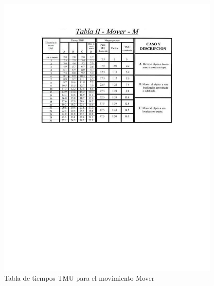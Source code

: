 \begin{figure}[H]
        \centering
        \includegraphics[trim = {42mm 150mm 42mm 24mm},clip,scale=0.6]{19/Img/tablaMover.pdf}
        \caption{Tabla de tiempos TMU para el movimiento Mover}
        \label{fig:tablaMover}
    \end{figure}
